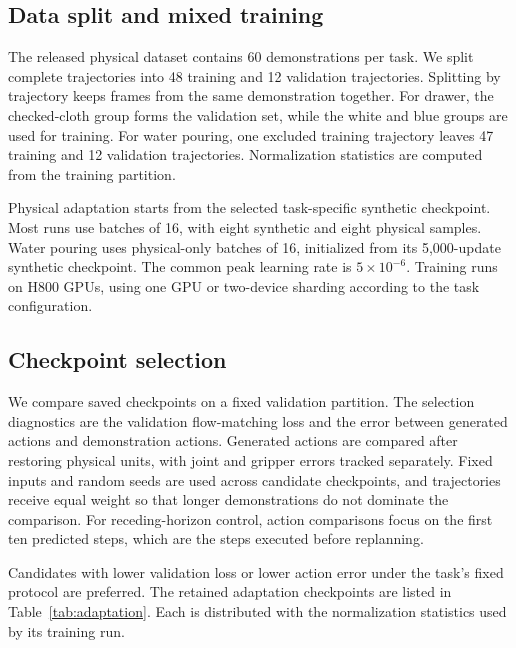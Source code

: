 \documentclass{article}
\begin{document}
\subsection{Data split and mixed training}
The released physical dataset contains 60 demonstrations per task.
We split complete trajectories into 48 training and 12 validation
trajectories. Splitting by trajectory keeps frames from the same
demonstration together. For drawer, the checked-cloth group forms the
validation set, while the white and blue groups are used for training.
For water pouring, one excluded training trajectory leaves 47 training
and 12 validation trajectories. Normalization statistics are computed
from the training partition.

Physical adaptation starts from the selected task-specific synthetic
checkpoint. Most runs use batches of 16, with eight synthetic and eight
physical samples. Water pouring uses physical-only batches of 16,
initialized from its 5,000-update synthetic checkpoint. The common peak
learning rate is $5\times10^{-6}$. Training runs on H800 GPUs, using one
GPU or two-device sharding according to the task configuration.

\subsection{Checkpoint selection}
We compare saved checkpoints on a fixed validation partition. The
selection diagnostics are the validation flow-matching loss and the
error between generated actions and demonstration actions. Generated
actions are compared after restoring physical units, with joint and
gripper errors tracked separately. Fixed inputs and random seeds are
used across candidate checkpoints, and trajectories receive equal
weight so that longer demonstrations do not dominate the comparison.
For receding-horizon control, action comparisons focus on the first ten
predicted steps, which are the steps executed before replanning.

Candidates with lower validation loss or lower action error under the
task's fixed protocol are preferred. The retained adaptation checkpoints
are listed in Table~\ref{tab:adaptation}. Each is distributed with the
normalization statistics used by its training run.
\end{document}
